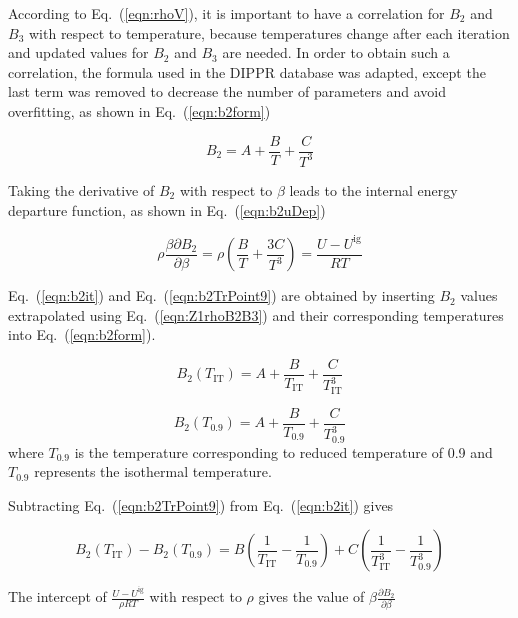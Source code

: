 \documentclass[5p,times]{elsarticle}
\begin{document}
According to Eq.~(\ref{eqn:rhoV}), it is important to have a correlation for $B_2$ and $B_3$ with respect to temperature, because temperatures change after each iteration and updated values for $B_2$ and $B_3$ are needed. In order to obtain such a correlation, the formula used in the DIPPR \cite{DIPPR2004} database was adapted, except the last term was removed to decrease the number of parameters and avoid overfitting, as shown in Eq.~(\ref{eqn:b2form}) 

\begin{equation}
B_2=A+\frac{B}{T}+\frac{C}{T^3} \label{eqn:b2form}
\end{equation}

Taking the derivative of $B_2$ with respect to $\beta$ leads to the internal energy departure function, as shown in  Eq.~(\ref{eqn:b2uDep})

\begin{equation}
\rho \frac{\beta \partial B_2}{\partial \beta}=\rho \left( \frac{B}{T}+\frac{3C}{T^3}\right)=\frac{U-U^{\mathrm{ig}}}{RT} \label{eqn:b2uDep}
\end{equation}

Eq.~(\ref{eqn:b2it}) and Eq.~(\ref{eqn:b2TrPoint9}) are obtained by inserting $B_2$ values extrapolated using Eq.~(\ref{eqn:Z1rhoB2B3}) and their corresponding temperatures into Eq.~(\ref{eqn:b2form}). 

\begin{equation}
B_2(T_{\mathrm{IT}})=A+\frac{B}{T_{\mathrm{IT}}}+\frac{C}{T_{\mathrm{IT}}^3} \label{eqn:b2it}
\end{equation}

\begin{equation}
B_2(T_{0.9})=A+\frac{B}{T_{0.9}}+\frac{C}{T_{0.9}^3} \label{eqn:b2TrPoint9}
\end{equation}
where $T_{0.9}$ is the temperature corresponding to reduced temperature of 0.9 and $T_{0.9}$ represents the isothermal temperature. 

Subtracting Eq.~(\ref{eqn:b2TrPoint9}) from Eq.~(\ref{eqn:b2it}) gives


\begin{equation}
B_2(T_{\mathrm{IT}})-B_2(T_{0.9})=B \left( \frac{1}{T_{\mathrm{IT}}}-\frac{1}{T_{0.9}} \right) +C \left( \frac{1}{T_{\mathrm{IT}}^3}-\frac{1}{T_{0.9}^3} \right) \label{eqn:b2subtract}
\end{equation}

The intercept of $\frac{U-U^{\mathrm{ig}}}{\rho RT}$ with respect to $\rho$ gives the value of $\beta \frac{\partial B_2}{\partial \beta}$
\end{document}
